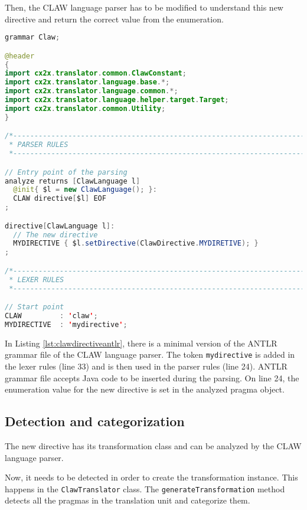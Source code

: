 Then, the CLAW language parser has to be modified to understand this new
directive and return the correct value from the enumeration.

\begin{lstlisting}[label=lst:clawdirectiveantlr, caption=Claw.g4, language=java]
grammar Claw;

@header
{
import cx2x.translator.common.ClawConstant;
import cx2x.translator.language.base.*;
import cx2x.translator.language.common.*;
import cx2x.translator.language.helper.target.Target;
import cx2x.translator.common.Utility;
}

/*----------------------------------------------------------------------------
 * PARSER RULES
 *----------------------------------------------------------------------------*/

// Entry point of the parsing
analyze returns [ClawLanguage l]
  @init{ $l = new ClawLanguage(); }:
  CLAW directive[$l] EOF
;

directive[ClawLanguage l]:
  // The new directive
  MYDIRECTIVE { $l.setDirective(ClawDirective.MYDIRETIVE); }
;

/*----------------------------------------------------------------------------
 * LEXER RULES
 *----------------------------------------------------------------------------*/

// Start point
CLAW         : 'claw';
MYDIRECTIVE  : 'mydirective';
\end{lstlisting}

In Listing \ref{lst:clawdirectiveantlr}, there is a minimal version of the
ANTLR grammar file of the CLAW language parser. The token
\lstinline|mydirective| is added in the lexer rules (line 33) and is then
used in the parser rules (line 24). ANTLR grammar file accepts Java code
to be inserted during the parsing. On line 24, the enumeration value for
the new directive is set in the analyzed pragma object.

\subsection{Detection and categorization}
The new directive has its transformation class and can be analyzed by the
CLAW language parser.

Now, it needs to be detected in order to create the transformation instance.
This happens in the \lstinline|ClawTranslator| class. The
\lstinline|generateTransformation| method detects all the pragmas in the
translation unit and categorize them.

